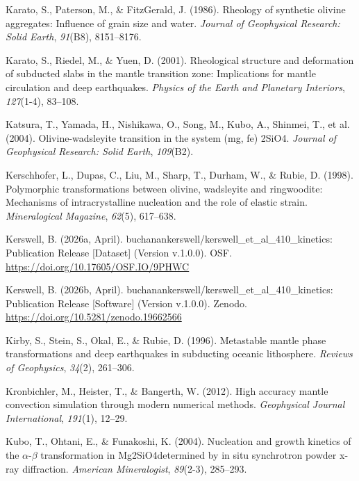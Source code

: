 \documentclass[draft,linenumbers]{agujournal2019}
\newlength{\cslhangindent}
\newenvironment{CSLReferences}[2]
 {\begin{list}{}{
  \setlength{\itemindent}{0pt}
  \setlength{\leftmargin}{0pt}
  \setlength{\parsep}{0pt}
  \ifodd #1
   \setlength{\leftmargin}{\cslhangindent}
   \setlength{\itemindent}{-\cslhangindent}
  \fi
  \setlength{\itemsep}{#2\baselineskip}
  }
  \item\relax}
 {\end{list}}
\begin{document}
\begin{CSLReferences}{1}{0}
Karato, S., Paterson, M., \& FitzGerald, J. (1986). Rheology of
synthetic olivine aggregates: Influence of grain size and water.
\emph{Journal of Geophysical Research: Solid Earth}, \emph{91}(B8),
8151--8176.

Karato, S., Riedel, M., \& Yuen, D. (2001). Rheological structure and
deformation of subducted slabs in the mantle transition zone:
Implications for mantle circulation and deep earthquakes. \emph{Physics
of the Earth and Planetary Interiors}, \emph{127}(1-4), 83--108.

{Katsura, T., Yamada, H., Nishikawa, O., Song, M., Kubo, A., Shinmei,
T., et al.} (2004). Olivine-wadsleyite transition in the system (mg, fe)
2SiO4. \emph{Journal of Geophysical Research: Solid Earth},
\emph{109}(B2).

Kerschhofer, L., Dupas, C., Liu, M., Sharp, T., Durham, W., \& Rubie, D.
(1998). Polymorphic transformations between olivine, wadsleyite and
ringwoodite: Mechanisms of intracrystalline nucleation and the role of
elastic strain. \emph{Mineralogical Magazine}, \emph{62}(5), 617--638.

Kerswell, B. (2026a, April).
{buchanankerswell/kerswell\_et\_al\_410\_kinetics: Publication Release
{[}Dataset{]}} (Version v.1.0.0). OSF.
\url{https://doi.org/10.17605/OSF.IO/9PHWC}

Kerswell, B. (2026b, April).
{buchanankerswell/kerswell\_et\_al\_410\_kinetics: Publication Release
{[}Software{]}} (Version v.1.0.0). Zenodo.
\url{https://doi.org/10.5281/zenodo.19662566}

Kirby, S., Stein, S., Okal, E., \& Rubie, D. (1996). Metastable mantle
phase transformations and deep earthquakes in subducting oceanic
lithosphere. \emph{Reviews of Geophysics}, \emph{34}(2), 261--306.

Kronbichler, M., Heister, T., \& Bangerth, W. (2012). High accuracy
mantle convection simulation through modern numerical methods.
\emph{Geophysical Journal International}, \emph{191}(1), 12--29.

Kubo, T., Ohtani, E., \& Funakoshi, K. (2004). Nucleation and growth
kinetics of the \(\alpha\)-\(\beta\) transformation in Mg2SiO4determined
by in situ synchrotron powder x-ray diffraction. \emph{American
Mineralogist}, \emph{89}(2-3), 285--293.


\end{CSLReferences}
\end{document}

